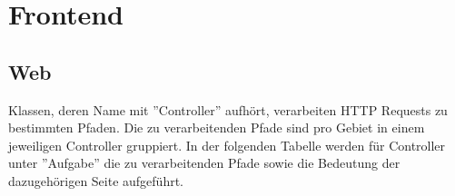 
\section{Frontend}

\subsection{Web}


\noindent
Klassen, deren Name mit ''Controller'' aufhört, verarbeiten HTTP Requests zu bestimmten Pfaden.
Die zu verarbeitenden Pfade sind pro Gebiet in einem jeweiligen Controller gruppiert.
In der folgenden Tabelle werden für Controller unter ''Aufgabe'' die zu verarbeitenden Pfade sowie die Bedeutung der dazugehörigen Seite aufgeführt.

